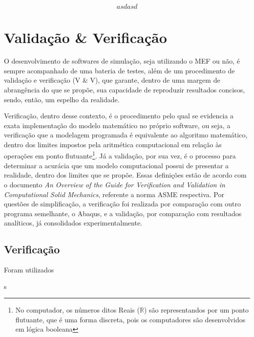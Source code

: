 

$$ asdasd $$
\chapter{Validação \& Verificação}


O desenvolvimento de softwares de simulação, seja utilizando o MEF ou não, é sempre acompanhado de uma bateria de testes, além de um procedimento de validação e verificação (V \& V), que garante, dentro de uma margem de abrangência do que se propõe, sua capacidade de reproduzir resultados concisos, sendo, então, um espelho da realidade.

Verificação, dentro desse contexto, é o procedimento pelo qual se evidencia a exata implementação do modelo matemático no próprio software, ou seja, a verificação que a modelagem programada é equivalente ao algoritmo matemático, dentro dos limites impostos pela aritmética computacional em relação às operações em ponto flutuante\footnote{No computador, os números ditos Reais ($\mathbb{R}$) são representandos por um ponto flutuante, que é uma forma discreta, pois os computadores são desenvolvidos em lógica booleana}. Já a validação, por sua vez, é o processo para determinar a acurácia que um modelo computacional possui de presentar a realidade, dentro dos limites que se propõe. Essas definições estão de acordo com o documento \emph{An Overview of the Guide for Verification and Validation
in Computational Solid Mechanics}, referente a norma ASME respectiva. Por questões de simplificação, a verificação foi realizada por comparação com outro programa semelhante, o Abaqus, e a validação, por comparação com resultados analíticos, já consolidados experimentalmente.

\section{Verificação}

Foram utilizados 


s
